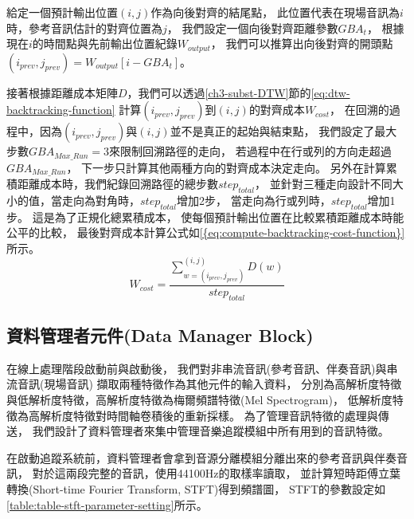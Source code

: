 \documentclass[class=NCU_thesis, crop=false]{standalone}
\begin{document}
給定一個預計輸出位置$(i, j)$作為向後對齊的結尾點，
此位置代表在現場音訊為$i$時，參考音訊估計的對齊位置為$j$，
我們設定一個向後對齊距離參數$GBA_{t}$，
根據現在$i$的時間點與先前輸出位置紀錄$W_{output}$，
我們可以推算出向後對齊的開頭點$(i_{prev}, j_{prev}) = W_{output}[i-GBA_{t}]$。

接著根據距離成本矩陣$D$，我們可以透過\ref{ch3-subst-DTW}節的\cref{eq:dtw-backtracking-function}
計算$(i_{prev}, j_{prev})$到$(i, j)$的對齊成本$W_{cost}$，
在回溯的過程中，因為$(i_{prev}, j_{prev})$與$(i, j)$並不是真正的起始與結束點，
我們設定了最大步數$GBA_{Max\_Run}=3$來限制回溯路徑的走向，
若過程中在行或列的方向走超過$GBA_{Max\_Run}$，
下一步只計算其他兩種方向的對齊成本決定走向。
另外在計算累積距離成本時，我們紀錄回溯路徑的總步數$step_{total}$，
並針對三種走向設計不同大小的值，當走向為對角時，$step_{total}$增加2步，
當走向為行或列時，$step_{total}$增加1步。
這是為了正規化總累積成本，
使每個預計輸出位置在比較累積距離成本時能公平的比較，
最後對齊成本計算公式如\cref{{eq:compute-backtracking-cost-function}}所示。
\begin{equation}
    \label{eq:compute-backtracking-cost-function}
    W_{cost} = \frac{\sum_{w = (i_{prev}, j_{prev})}^{(i, j)}D(w)}{step_{total}} 
\end{equation}



\subsection{資料管理者元件(Data Manager Block)} \label{ch3-subst-data-manager}
在線上處理階段啟動前與啟動後，
我們對非串流音訊(參考音訊、伴奏音訊)與串流音訊(現場音訊)
擷取兩種特徵作為其他元件的輸入資料，
分別為高解析度特徵與低解析度特徵，高解析度特徵為梅爾頻譜特徵(Mel Spectrogram)，
低解析度特徵為高解析度特徵對時間軸卷積後的重新採樣。
為了管理音訊特徵的處理與傳送，
我們設計了資料管理者來集中管理音樂追蹤模組中所有用到的音訊特徵。

在啟動追蹤系統前，資料管理者會拿到音源分離模組分離出來的參考音訊與伴奏音訊，
對於這兩段完整的音訊，使用44100Hz的取樣率讀取，
並計算短時距傅立葉轉換(Short-time Fourier Transform, STFT)得到頻譜圖，
STFT的參數設定如\cref{table:table-stft-parameter-setting}所示。
\end{document}
